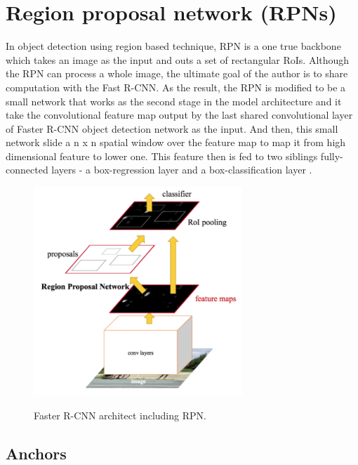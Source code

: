 	
\section{Region proposal network (RPNs)}
\label{section:rpns}
\noindent	

	In object detection using region based technique, RPN is a one true backbone which takes an image as the input and outs a set of rectangular RoIs. Although the RPN can process a whole image, the ultimate goal of the author is to share computation with the Fast R-CNN. As the result, the RPN is modified to be a small network that works as the second stage in the model architecture and it take the convolutional feature map output by the last shared convolutional layer of Faster R-CNN object detection network as the input. And then, this small network slide a n x n spatial window over the feature map to map it from high dimensional feature to lower one. This feature then is fed to two siblings fully-connected layers - a box-regression layer and a box-classification layer \cite{fasterrcnn}.
	
	\begin{figure}[H]
		\centering
		{\includegraphics[width=0.7\textwidth]{./hinhanh/chap4/faster_rcnn.png}}
		\caption{Faster R-CNN architect including RPN.}
	\end{figure}
	
\subsection{Anchors}
\label{subsection:anchors}
\noindent		

